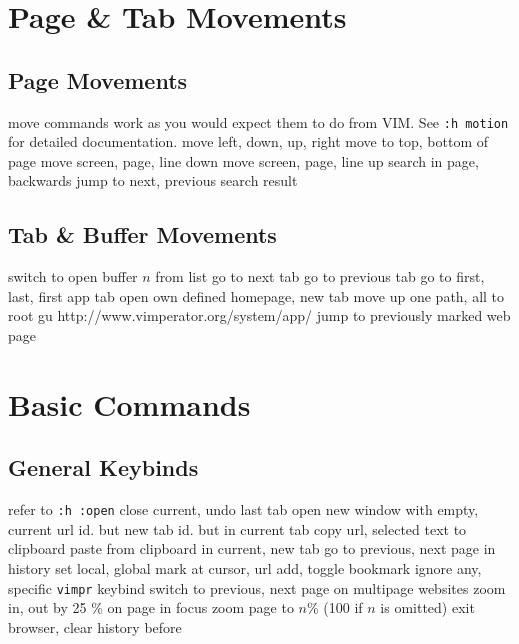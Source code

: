 
\def\content{\uppercase{vimperator}}
\def\shortcontent{Vimpr}
\def\versionnumber{1.2}  %
\def\version{v\versionnumber\ \month\ \year}


\mytitle

\shortintro
\shortintroVimpr

\section{Page \& Tab Movements}{}
\subsection{Page Movements}{move commands work as you would expect them to do
from VIM. See {\tt :h motion} for detailed documentation.}
	{move left, down, up, right}
	{move to top, bottom of page}
	{move screen, page, line down}
	{move screen, page, line up}
	{search in page, backwards}
	{jump to next, previous search result}


\subsection{Tab \& Buffer Movements}{}
	{switch to open buffer $n$ from list}
	{go to next tab}
	{go to previous tab}
	{go to first, last, first app tab}
	{open own defined homepage, new tab}
	{move up one path, all to root}
	{gu http://www.vimperator.org/system/app/}
	{jump to previously marked web page}


\section{Basic Commands}{}
\subsection{General Keybinds}	{refer to {\tt :h :open}}
	{close current, undo last tab}
	{open new window with empty, current url}
	{id. but new tab}
	{id. but in current tab}
	{copy url, selected text to clipboard}
	{paste from clipboard in current, new tab}
	{go to previous, next page in history}
	{set local, global mark at cursor, url}
	{add, toggle bookmark}
	{ignore any, specific {\tt vimpr} keybind}
\cmdS{\lbracket\lbracket~\rbracket\rbracket}	{switch to previous, next page on multipage websites}
\cmdS{+~-}	{zoom in, out by 25 \% on page in focus}
	{zoom page to $n$\% (100 if $n$ is omitted)}
	{exit browser, clear history before}

